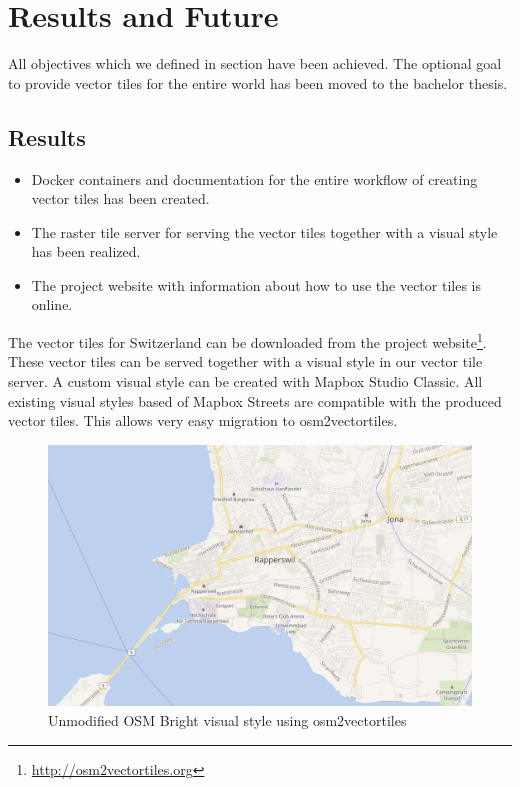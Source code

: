 \chapter{Results and Future}\label{part1_results_and_future}

All objectives which we defined in section  have been achieved. The optional goal to provide vector tiles for the entire world has been moved to the bachelor thesis.

\section{Results}\label{part1_results}

\begin{itemize}
\item
  Docker containers and documentation for the entire workflow of creating vector tiles has been created.
\item
  The raster tile server for serving the vector tiles together with a visual style has been realized.
\item
  The project website with information about how to use the vector tiles is online.
\end{itemize}

The vector tiles for Switzerland can be downloaded from the project website\footnote{\url{http://osm2vectortiles.org}}. These vector tiles can be served together with a visual style in our vector tile server.
\newline{}
A custom visual style can be created with Mapbox Studio Classic\cite{mapbox_studio_classic}.
All existing visual styles based of Mapbox Streets are compatible with the produced vector tiles. This allows very easy migration to osm2vectortiles.

\begin{figure}[H]
  \includegraphics[width=1\textwidth]{images/unmodified_osm_bright.png}
  \caption{Unmodified OSM Bright visual style using osm2vectortiles}
\end{figure}

